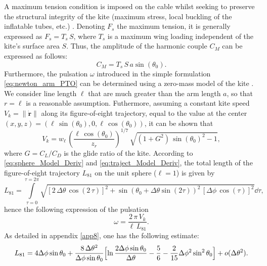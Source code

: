 A maximum tension condition is imposed on the cable whilst seeking to preserve the structural integrity of the kite (maximum stress, local buckling of the inflatable tubes, etc.) \cite{Desenclos2023MCM}. Denoting \(F_s\) the maximum tension, it is generally expressed as \(F_s=T_s\, S\), where \(T_s\) is a maximum wing loading independent of the kite’s surface area \(S\). Thus, the amplitude of the harmonic couple \(C_M\) can be expressed as follows:
\begin{equation} \label{eq:C_M_PTO}
    C_M=T_s\, S\,a \sin(\theta_0).
\end{equation}
Furthermore, the pulsation \(\omega\) introduced in the simple formulation \eqref{eq:newton_arm_PTO} can be determined using a zero-mass model of the  kite \cite{Leloup2014OE}. We consider line length \(\ell\) that are much greater than the arm length \(a\), so that \(r=\ell\) is a reasonable assumption. Futhermore, assuming a constant kite speed \(V_k=\lVert \dot{\boldsymbol{r}} \rVert\) along its figure-of-eight trajectory, equal to the value at the center \((x,y,z)=(\ell\,\sin(\theta_0),0,\ell\,\cos(\theta_0))\), it can be shown that 
\begin{equation} \label{eq:Vk_PTO}
    V_k=w_\ell\,\left(\frac{\ell\,\cos(\theta_0)}{z_r}\right)^{1/7}\,\sqrt{\left(1+G^2\right)\,{\sin(\theta_0)}^2-1},
\end{equation}
where \(G=C_L/C_D\) is the glide ratio of the kite. According to \eqref{eq:sphere_Model_Deriv} and \eqref{eq:traject_Model_Deriv}, the total length of the figure-of-eight trajectory \(L_{81}\) on the unit sphere (\(\ell=1\)) is given by
\begin{equation} \label{eq:L81_PTO}
    L_{81}=\int \limits_{\tau=0}^{\tau=2\pi} \sqrt{\left[2 \, \Delta\theta\, \cos(2\,\tau)\right]^2+{\sin(\theta_0 + \Delta\theta \sin(2\tau))}^2\,\left[\Delta\phi\, \cos(\tau)\right]^2} \dd{\tau},
\end{equation}
hence the following expression of the pulsation
\begin{equation} \label{eq:Omega_PTO}
    \omega=\frac{2\,\pi\,V_k}{\ell\,L_{81}}.
\end{equation}
As detailed in appendix \ref{app8}, one has the following estimate:
\begin{equation} \label{eq:L81_PTO_approx}
L_{81}=4\Delta\phi\sin\theta_0+\frac{8\,\Delta\theta^2}{\Delta\phi\sin\theta_0}\Bigl[\ln\frac{2\Delta\phi\sin\theta_0}{\Delta\theta}-\frac56-\frac2{15}\Delta\phi^2\sin^2\theta_0\Bigr]+o(\Delta\theta^2).
\end{equation}
